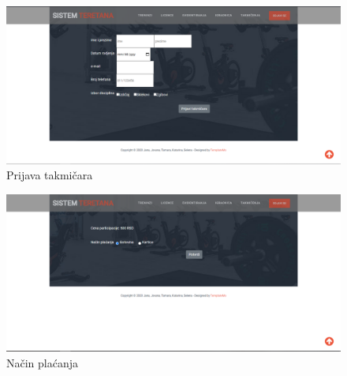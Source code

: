 \documentclass[../main.tex]{subfiles}
\begin{document}
\begin{figure}[!ht]
\begin{center}
\includegraphics[scale=0.35]{sections/korisnicki_interfejs/screenshots/takmicenja_prijavi_takmicara.PNG}
\end{center}
\caption{Prijava takmičara}
\label{fig:t_prijaviT}
\end{figure}

\begin{figure}[!ht]
\begin{center}
\includegraphics[scale=0.35]{sections/korisnicki_interfejs/screenshots/takmicenja_nacin_placanja.PNG}
\end{center}
\caption{Način plaćanja}
\label{fig:t_uplata}
\end{figure}
\end{document}
